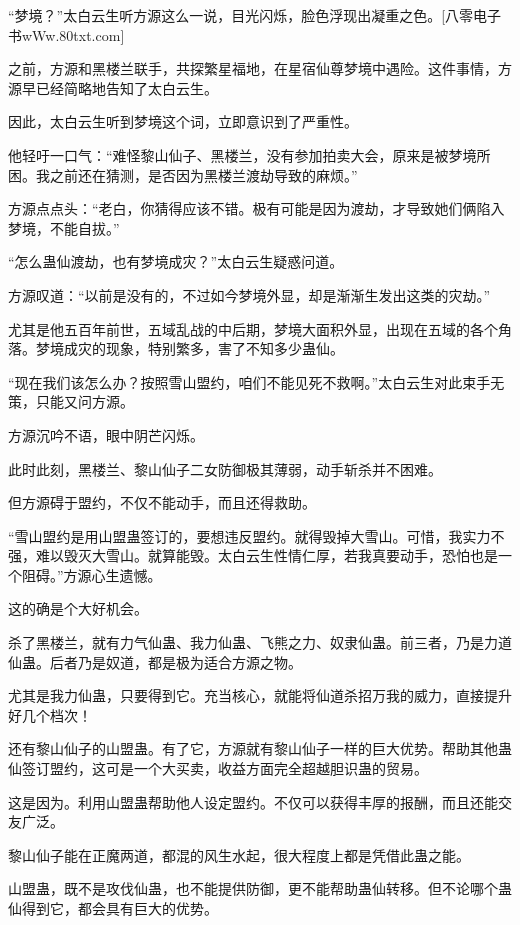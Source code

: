 
\begin{this_body}

“梦境？”太白云生听方源这么一说，目光闪烁，脸色浮现出凝重之色。[八零电子书wWw.80txt.com]

之前，方源和黑楼兰联手，共探繁星福地，在星宿仙尊梦境中遇险。这件事情，方源早已经简略地告知了太白云生。

因此，太白云生听到梦境这个词，立即意识到了严重性。

他轻吁一口气：“难怪黎山仙子、黑楼兰，没有参加拍卖大会，原来是被梦境所困。我之前还在猜测，是否因为黑楼兰渡劫导致的麻烦。”

方源点点头：“老白，你猜得应该不错。极有可能是因为渡劫，才导致她们俩陷入梦境，不能自拔。”

“怎么蛊仙渡劫，也有梦境成灾？”太白云生疑惑问道。

方源叹道：“以前是没有的，不过如今梦境外显，却是渐渐生发出这类的灾劫。”

尤其是他五百年前世，五域乱战的中后期，梦境大面积外显，出现在五域的各个角落。梦境成灾的现象，特别繁多，害了不知多少蛊仙。

“现在我们该怎么办？按照雪山盟约，咱们不能见死不救啊。”太白云生对此束手无策，只能又问方源。

方源沉吟不语，眼中阴芒闪烁。

此时此刻，黑楼兰、黎山仙子二女防御极其薄弱，动手斩杀并不困难。

但方源碍于盟约，不仅不能动手，而且还得救助。

“雪山盟约是用山盟蛊签订的，要想违反盟约。就得毁掉大雪山。可惜，我实力不强，难以毁灭大雪山。就算能毁。太白云生性情仁厚，若我真要动手，恐怕也是一个阻碍。”方源心生遗憾。

这的确是个大好机会。

杀了黑楼兰，就有力气仙蛊、我力仙蛊、飞熊之力、奴隶仙蛊。前三者，乃是力道仙蛊。后者乃是奴道，都是极为适合方源之物。

尤其是我力仙蛊，只要得到它。充当核心，就能将仙道杀招万我的威力，直接提升好几个档次！

还有黎山仙子的山盟蛊。有了它，方源就有黎山仙子一样的巨大优势。帮助其他蛊仙签订盟约，这可是一个大买卖，收益方面完全超越胆识蛊的贸易。

这是因为。利用山盟蛊帮助他人设定盟约。不仅可以获得丰厚的报酬，而且还能交友广泛。

黎山仙子能在正魔两道，都混的风生水起，很大程度上都是凭借此蛊之能。

山盟蛊，既不是攻伐仙蛊，也不能提供防御，更不能帮助蛊仙转移。但不论哪个蛊仙得到它，都会具有巨大的优势。


\end{this_body}
